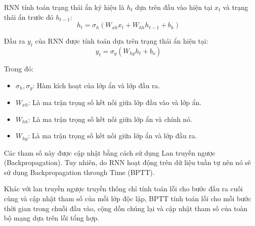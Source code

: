 \documentclass[conference]{IEEEtran}
\begin{document}
RNN tính toán trạng thái ẩn ký hiệu là \(h_t\) dựa trên đầu vào hiện tại \(x_t\) và trạng thái ẩn trước đó \(h_{t-1}\):
\[
h_t = \sigma_h (W_{xh} x_t + W_{hh} h_{t-1} + b_h)
\]

Đầu ra \(y_t\) của RNN được tính toán dựa trên trạng thái ẩn hiện tại:
\[
y_t = \sigma_y (W_{hy} h_t + b_o)
\]

Trong đó:
\begin{itemize}
    \item \(\sigma_h, \sigma_y\): Hàm kích hoạt của lớp ẩn và lớp đầu ra.
    \item \(W_{xh}\): Là ma trận trọng số kết nối giữa lớp đầu vào và lớp ẩn.
    \item \(W_{hh}\): Là ma trận trọng số kết nối giữa lớp ẩn và chính nó.
    \item \(W_{hy}\): Là ma trận trọng số kết nối giữa lớp ẩn và lớp đầu ra.
\end{itemize}

Các tham số này được cập nhật bằng cách sử dụng Lan truyền ngược (Backpropagation). Tuy nhiên, do RNN hoạt động trên dữ liệu tuần tự nên nó sẽ sử dụng Backpropagation through Time (BPTT).

Khác với lan truyền ngược truyền thống chỉ tính toán lỗi cho bước đầu ra cuối cùng và cập nhật tham số của mỗi lớp độc lập, BPTT tính toán lỗi cho mỗi bước thời gian trong chuỗi đầu vào, cộng dồn chúng lại và cập nhật tham số của toàn bộ mạng dựa trên lỗi tổng hợp.
\end{document}
